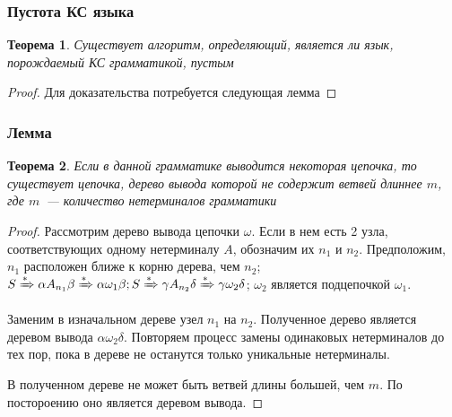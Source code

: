 \documentclass{beamer}
\newtheorem{rutheorem}{Теорема}
\newcommand{\derives}[1][*]{\xRightarrow[]{#1}}
\begin{document}
\begin{frame}[fragile]
  \transwipe[direction=90]
  \frametitle{Пустота КС языка}
   \begin{rutheorem}
   Существует алгоритм, определяющий, является ли язык, порождаемый КС грамматикой, пустым
   \end{rutheorem}
   \begin{proof}
     Для доказательства потребуется следующая лемма
   \end{proof}
\end{frame}
  


  
\begin{frame}[fragile]
  \transwipe[direction=90]
  \frametitle{Лемма}
   \begin{rutheorem}
   Если в данной грамматике выводится некоторая цепочка, то существует цепочка, дерево вывода которой не содержит ветвей длиннее $m$, где $m$~--- количество нетерминалов грамматики
   \end{rutheorem}

   \begin{proof}
   Рассмотрим дерево вывода цепочки $\omega$. Если в нем есть 2 узла, соответствующих одному нетерминалу $A$, обозначим их $n_1$ и $n_2$. Предположим, $n_1$ расположен ближе к корню дерева, чем $n_2$; $S \derives \alpha A_{n_1} \beta \derives \alpha \omega_1 \beta; S \derives \gamma A_{n_2} \delta \derives \gamma \omega_2 \delta$; $\omega_2$ является подцепочкой $\omega_1$. 
   
   Заменим в изначальном дереве узел $n_1$ на $n_2$. Полученное дерево является деревом вывода $\alpha \omega_2 \delta$. Повторяем процесс замены одинаковых нетерминалов до тех пор, пока в дереве не останутся только уникальные нетерминалы. 
   
   В полученном дереве не может быть ветвей длины большей, чем $m$. По постороению оно является деревом вывода. 
   \end{proof}
\end{frame}
\end{document}
